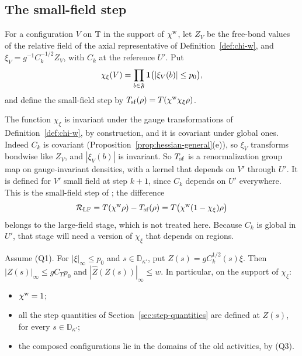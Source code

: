 \subsection{The small-field step}\label{subsec:cl-step}

\begin{definition}\label{def:small-field-step}
For a configuration $V$ on $\mathbb T$ in the support of $\chi^{\rm w}$, let $Z_V$ be the free-bond values of the relative field of the axial representative of Definition~\ref{def:chi-w}, and $\xi_V=g^{-1}C_k^{-1/2}Z_V$, with $C_k$ at the reference $U'$. Put
\[
\chi_\xi(V)=\prod_{b\in\mathfrak F}\mathbf 1\big(|\xi_V(b)|\le p_0\big),
\]
and define the small-field step by $T_{\rm sf}(\rho)=T(\chi^{\rm w}\chi_\xi\rho)$.
\end{definition}

The function $\chi_\xi$ is invariant under the gauge transformations of Definition~\ref{def:chi-w}, by construction, and it is covariant under global ones. Indeed $C_k$ is covariant (Proposition~\ref{prop:hessian-general}(e)), so $\xi_V$ transforms bondwise like $Z_V$, and $|\xi_V(b)|$ is invariant. So $T_{\rm sf}$ is a renormalization group map on gauge-invariant densities, with a kernel that depends on $V'$ through $U'$. It is defined for $V'$ small field at step $k+1$, since $C_k$ depends on $U'$ everywhere. This is the small-field step of \cite[(206)]{DimockI}; the difference
\[
\mathcal R_{\rm LF}=T(\chi^{\rm w}\rho)-T_{\rm sf}(\rho)=T\big(\chi^{\rm w}(1-\chi_\xi)\rho\big)
\]
belongs to the large-field stage, which is not treated here. Because $C_k$ is global in $U'$, that stage will need a version of $\chi_\xi$ that depends on regions.

\begin{lemma}\label{lem:white-noise}
Assume (Q1). For $|\xi|_\infty\le p_0$ and $s\in\mathbb D_{\kappa'}$, put $Z(s)=gC_k^{1/2}(s)\xi$. Then $|Z(s)|_\infty\le gC_Tp_0$ and $|\hat Z(Z(s))|_\infty\le w$. In particular, on the support of $\chi_\xi$:
\begin{itemize}
\item $\chi^{\rm w}=1$;
\item all the step quantities of Section~\ref{sec:step-quantities} are defined at $Z(s)$, for every $s\in\mathbb D_{\kappa'}$;
\item the composed configurations lie in the domains of the old activities, by (Q3).
\end{itemize}
\end{lemma}

